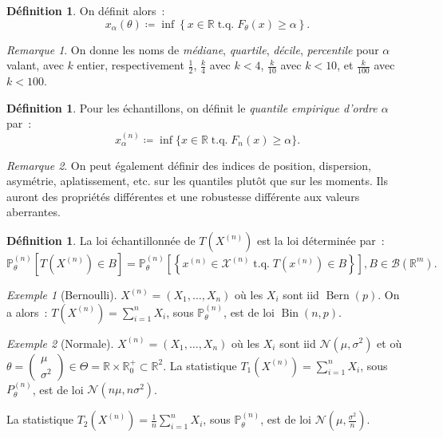 \documentclass{report}
\DeclareMathOperator{\tq}{\text{ t.q. }}
\DeclareMathOperator{\Bern}{Bern}  %
\DeclareMathOperator{\Bin}{Bin}  %
\renewcommand{\P}{\mathbb P}
\newcommand{\Nms}{\mathcal N(\mu, \sigma^2)}
\newcommand{\R}{\mathbb R}
\newcommand{\Brl}{\mathcal B}  %
\theoremstyle{definition}
\newtheorem{déf}[thm]{Définition}
\theoremstyle{remark}
\newtheorem*{rmq}{Remarque}
\newtheorem{ex}{Exemple}[chapter]
\begin{document}
		\begin{déf} On définit alors~:
		\[x_\alpha(\theta) \coloneqq \inf\left\{x \in \R \tq F_\theta(x) \geq \alpha\right\}.\]
		\end{déf}

		\begin{rmq} On donne les noms de \textit{médiane}, \textit{quartile}, \textit{décile}, \textit{percentile} pour $\alpha$ valant, avec $k$ entier,
		respectivement $\frac 12$, $\frac k4$ avec $k < 4$, $\frac k{10}$ avec $k < 10$, et $\frac k{100}$ avec $k < 100$.
		\end{rmq}

		\begin{déf} Pour les échantillons, on définit le \textit{quantile empirique d'ordre $\alpha$} par~:
		\[x_\alpha^{(n)} \coloneqq \inf\{x \in \R \tq F_n(x) \geq \alpha\}.\]
		\end{déf}

		\begin{rmq} On peut également définir des indices de position, dispersion, asymétrie, aplatissement, etc. sur les quantiles plutôt que sur les moments.
		Ils auront des propriétés différentes et une robustesse différente aux valeurs aberrantes.
		\end{rmq}

		\begin{déf} La loi échantillonnée de $T(X^{(n)})$ est la loi déterminée par~:
		\[\P_\theta^{(n)}\left[T(X^{(n)}) \in B\right] = \P_\theta^{(n)}\left[\left\{x^{(n)} \in \mathcal X^{(n)} \tq T(x^{(n)}) \in B\right\}\right], B \in \Brl(\R^m).\]
		\end{déf}

		\begin{ex}[Bernoulli] $X^{(n)} = (X_1, \ldots, X_n)$ où les $X_i$ sont iid $\Bern(p)$. On a alors~: $T(X^{(n)}) = \sum_{i=1}^nX_i$, sous
		$\P_\theta^{(n)}$, est de loi $\Bin(n, p)$.
		\end{ex}

		\begin{ex}[Normale] $X^{(n)} = (X_1, \ldots, X_n)$ où les $X_i$ sont iid $\Nms$ et où
		$\theta = \begin{pmatrix}\mu \\ \sigma^2\end{pmatrix} \in \Theta = \R \times \R^+_0 \subset \R^2$.
		La statistique $T_1(X^{(n)}) = \sum_{i=1}^nX_i$, sous $P_\theta^{(n)}$, est de loi $\mathcal N(n\mu, n\sigma^2)$.

		La statistique $T_2(X^{(n)}) = \frac 1n\sum_{i=1}^nX_i$, sous $\P_\theta^{(n)}$, est de loi $\mathcal N(\mu, \frac {\sigma^2}n)$.
		\end{ex}
\end{document}
